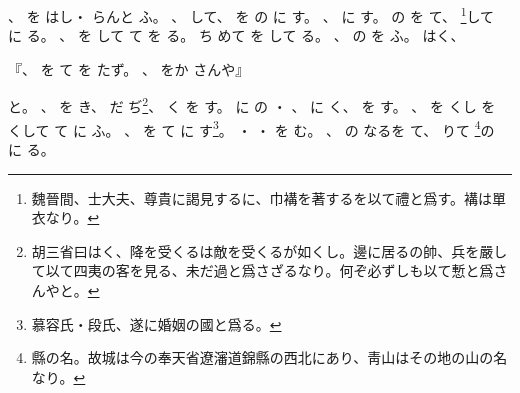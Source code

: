 \documentclass[a4paper,12pt]{article}
\begin{document}
、%
を%
はし・%
らんと%
ふ。%
、%
して、%
を%
の%
に%
す。%
、%
に%
す。%
の%
を%
て、%
\footnote{魏晉間、士大夫、尊貴に謁見するに、巾褠を著するを以て禮と爲す。褠は單衣なり。}して%
に%
る。%
、%
を%
して%
て%
を%
る。%
%
ち%
めて%
を%
して%
る。%
、%
の%
を%
ふ。%
%
はく、%
\begin{quoting}
『、%
を%
て%
を%
たず。%
、%
をか%
さんや』%
\end{quoting}
と。%
、%
を%
き、%
だ%
ぢ\footnote{胡三省曰はく、降を受くるは敵を受くるが如くし。邊に居るの帥、兵を嚴して以て四夷の客を見る、未だ過と爲さざるなり。何ぞ必ずしも以て慙と爲さんやと。}、%
く%
を%
す。%
に%
の%
・%
、%
に%
く、%
%
を%
す。%
、%
を%
くし%
を%
くして%
て%
に%
ふ。%
%
%
、%
を%
て%
に%
す\footnote{慕容氏・段氏、遂に婚姻の國と爲る。}。%
・%
・%
を%
む。%
、%
の%
なるを%
て、%
りて%
\hypertarget{tokanoseizan}{%
\footnote{縣の名。故城は今の奉天省遼瀋道錦縣の西北にあり、靑山はその地の山の名なり。}の%
に%
る}。%
\end{document}
